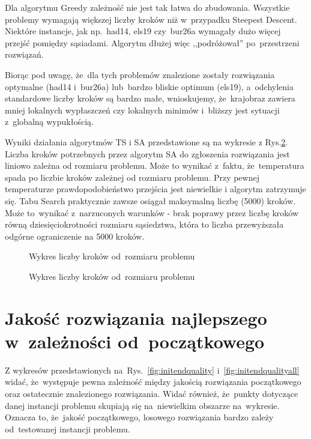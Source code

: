 \documentclass[a4paper,10pt]{article}
\begin{document}
Dla algorytmu Greedy zależność nie jest tak łatwa do zbudowania.
Wszystkie problemy wymagają większej liczby kroków niż w~przypadku Steepest Descent. 
Niektóre instancje, jak np.~had14, els19 czy~bur26a wymagały dużo więcej przejść pomiędzy sąsiadami.
Algorytm dłużej więc ,,podróżował'' po~przestrzeni rozwiązań.

Biorąc pod uwagę, że~dla tych problemów znalezione zostały rozwiązania optymalne (had14 i~bur26a)
lub~bardzo bliskie optimum (els19), a~odchylenia standardowe liczby kroków są bardzo małe, wnioskujemy,
że~krajobraz zawiera mniej lokalnych wypłaszczeń czy lokalnych minimów i~bliższy jest sytuacji z~globalną wypukłością.

Wyniki działania algorytmów TS i SA przedstawione są na wykresie z Rys.\ref{fig:stepssizeMETA}.
Liczba kroków potrzebnych przez algorytm SA do zgłoszenia rozwiązania jest liniowo zależna od rozmiaru problemu. 
Może to wynikać z~faktu, że~temperatura spada po liczbie kroków zależnej od rozmiaru problemu.
Przy pewnej temperaturze prawdopodobieństwo przejścia jest niewielkie i algorytm zatrzymuje się.
Tabu Search praktycznie zawsze osiągał maksymalną liczbę (5000) kroków. 
Może to~wynikać z~narzuconych warunków - brak poprawy przez liczbę kroków równą dziesięciokrotności rozmiaru sąsiedztwa, która to liczba przewyższała odgórne ograniczenie na 5000 kroków.

\begin{figure}[!htpb]
\begin{center}

\caption{Wykres liczby kroków od~rozmiaru problemu}
\label{fig:stepssize}
\end{center}
\end{figure}

\begin{figure}[!htpb]
\begin{center}

\caption{Wykres liczby kroków od~rozmiaru problemu}
\label{fig:stepssizeMETA}
\end{center}
\end{figure}

\section{Jakość rozwiązania najlepszego w~zależności od~początkowego}
Z wykresów przedstawionych na~Rys.~\ref{fig:initendquality} i~\ref{fig:initendqualityall} widać, że~występuje pewna zależność
między jakością rozwiązania początkowego oraz ostatecznie znalezionego rozwiązania. Widać również, że~punkty dotyczące
danej instancji problemu skupiają się na~niewielkim obszarze na~wykresie. Oznacza to, że~jakość początkowego, losowego
rozwiązania bardzo zależy od~testowanej instancji problemu.
\end{document}
